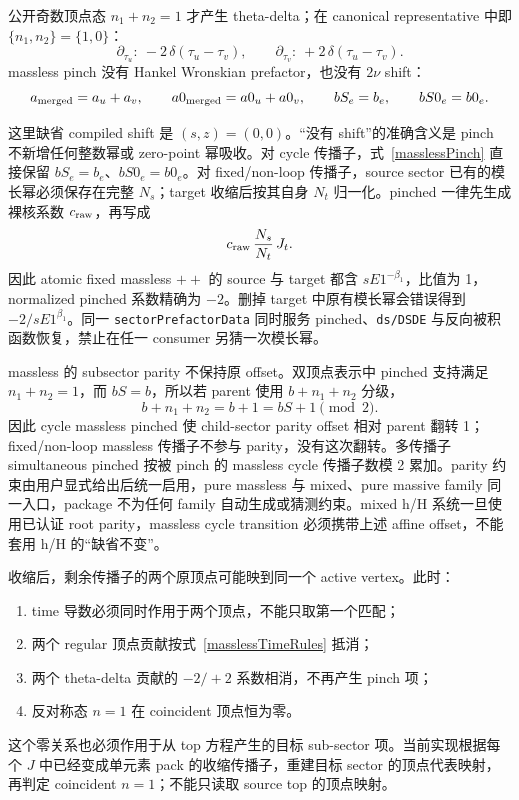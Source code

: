 ﻿\documentclass[a4paper,11pt]{article}
\begin{document}
公开奇数顶点态 $n_1+n_2=1$ 才产生 theta-delta；在 canonical representative 中即 $\{n_1,n_2\}=\{1,0\}$：
\begin{equation}
 \partial_{\tau_u}:\ -2\,\delta(\tau_u-\tau_v),
 \qquad
 \partial_{\tau_v}:\ +2\,\delta(\tau_u-\tau_v).
 \label{masslessDeltaSigns}
\end{equation}
massless pinch 没有 Hankel Wronskian prefactor，也没有 $2\nu$ shift：
\begin{equation}
 a_{\rm merged}=a_u+a_v,\qquad
 a0_{\rm merged}=a0_u+a0_v,\qquad
 bS_e=b_e,\qquad bS0_e=b0_e.
 \label{masslessPinch}
\end{equation}

这里缺省 compiled shift 是 $(s,z)=(0,0)$。“没有 shift”的准确含义是 pinch 不新增任何整数幂或 zero-point 幂吸收。对 cycle 传播子，式~\eqref{masslessPinch} 直接保留 $bS_e=b_e$、$bS0_e=b0_e$。对 fixed/non-loop 传播子，source sector 已有的模长幂必须保存在完整 $N_s$；target 收缩后按其自身 $N_t$ 归一化。pinched 一律先生成裸核系数 $c_{\rm raw}$，再写成
\begin{equation}
 c_{\rm raw}\,\frac{N_s}{N_t}\,J_t.
\end{equation}
因此 atomic fixed massless $++$ 的 source 与 target 都含 $sE1^{-\beta_1}$，比值为 1，normalized pinched 系数精确为 $-2$。删掉 target 中原有模长幂会错误得到 $-2/sE1^{\beta_1}$。同一 \texttt{sectorPrefactorData} 同时服务 pinched、\texttt{ds/DSDE} 与反向被积函数恢复，禁止在任一 consumer 另猜一次模长幂。

massless 的 subsector parity 不保持原 offset。双顶点表示中 pinched 支持满足 $n_1+n_2=1$，而 $bS=b$，所以若 parent 使用 $b+n_1+n_2$ 分级，
\begin{equation}
 b+n_1+n_2=b+1=bS+1\pmod 2.
 \label{manualMasslessPinchedParity}
\end{equation}
因此 cycle massless pinched 使 child-sector parity offset 相对 parent 翻转 1；fixed/non-loop massless 传播子不参与 parity，没有这次翻转。多传播子 simultaneous pinched 按被 pinch 的 massless cycle 传播子数模 2 累加。parity 约束由用户显式给出后统一启用，pure massless 与 mixed、pure massive family 同一入口，package 不为任何 family 自动生成或猜测约束。mixed h/H 系统一旦使用已认证 root parity，massless cycle transition 必须携带上述 affine offset，不能套用 h/H 的“缺省不变”。

收缩后，剩余传播子的两个原顶点可能映到同一个 active vertex。此时：
\begin{enumerate}
  \item time 导数必须同时作用于两个顶点，不能只取第一个匹配；
  \item 两个 regular 顶点贡献按式~\eqref{masslessTimeRules} 抵消；
  \item 两个 theta-delta 贡献的 $-2/+2$ 系数相消，不再产生 pinch 项；
  \item 反对称态 $n=1$ 在 coincident 顶点恒为零。
\end{enumerate}
这个零关系也必须作用于从 top 方程产生的目标 sub-sector 项。当前实现根据每个 $J$ 中已经变成单元素 pack 的收缩传播子，重建目标 sector 的顶点代表映射，再判定 coincident $n=1$；不能只读取 source top 的顶点映射。
\end{document}
